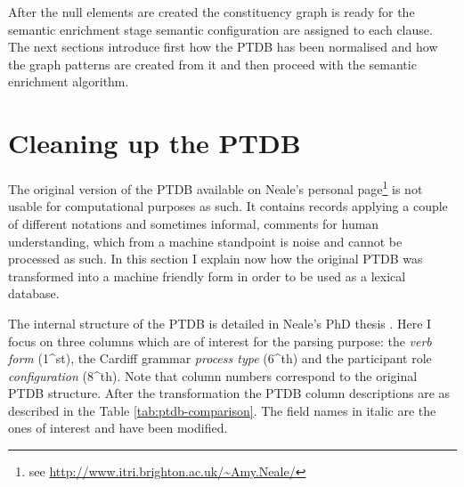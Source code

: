After the null elements are created the constituency graph is ready for the semantic enrichment stage semantic configuration are assigned to each clause. The next sections introduce first how the PTDB has been normalised and how the graph patterns are created from it and then proceed with the semantic enrichment algorithm.

\section{Cleaning up the PTDB}
The original version of the PTDB available on Neale's personal page\footnote{see \url{http://www.itri.brighton.ac.uk/~Amy.Neale/}} is not usable for computational purposes as such. It  contains records applying a couple of different notations and sometimes informal, comments for human understanding, which from a machine standpoint is noise and cannot be processed as such. In this section I explain now how the original PTDB was transformed into a machine friendly form in order to be used as a lexical database.

The internal structure of the PTDB is detailed in Neale's PhD thesis \citep[193--231]{Neale2002}. Here I focus on three columns which are of interest for the parsing purpose: the \textit{verb form} (1^{st}), the Cardiff grammar \textit{process type} (6^{th}) and the participant role \textit{configuration} (8^{th}). Note that column numbers correspond to the original PTDB structure. After the transformation the PTDB column descriptions are as described in the Table \ref{tab:ptdb-comparison}. The field names in italic are the ones of interest and have been modified.

